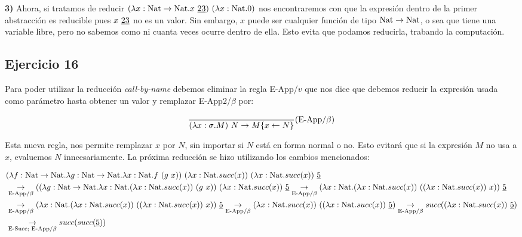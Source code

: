\documentclass[10pt,a4paper, landscape]{article}
\begin{document}
\begin{multicols}{2}
\textbf{3)} Ahora, si tratamos de reducir $(\lambda x: \text{Nat}\to\text{Nat} \text{.} x~\underline{23})~(\lambda x: \text{Nat} \text{.} 0)$ nos encontraremos con que la expresión dentro de la primer abstracción es reducible pues $x~\underline{23}$ no es un valor. Sin embargo,  $x$ puede ser cualquier función de tipo  $\text{Nat}\to\text{Nat}$, o sea que tiene una variable libre, pero no sabemos como ni cuanta veces ocurre dentro de ella. Esto evita que podamos reducirla, trabando la computación.
\end{multicols}


\newpage

\subsection{Ejercicio 16}
\begin{multicols}{2}
Para poder utilizar la reducción \textit{call-by-name} debemos eliminar la regla E-App/$v$ que nos dice que debemos reducir la expresión usada como parámetro hasta obtener un valor y remplazar E-App2/$\beta$ por:
\vfil

$$\frac{}{(\lambda x: \sigma \text{.} M)~N \to M\{x\leftarrow N\}}(\text{E-App/}\beta)$$

Esta nueva regla, nos permite remplazar $x$ por $N$, sin importar si $N$ está en forma normal o no. Esto evitará que si la expresión $M$ no usa a $x$, evaluemos $N$ inncesariamente. La próxima reducción se hizo utilizando los cambios mencionados:
\end{multicols}

\begin{equation*}
\begin{split}
&(\lambda f: \text{Nat}\to\text{Nat} \text{.} \lambda g: \text{Nat}\to\text{Nat} \text{.} \lambda x: \text{Nat} \text{.} f~(g~x))~(\lambda x: \text{Nat} \text{.} succ(x))~(\lambda x: \text{Nat} \text{.} succ(x))~\underline{5} \\
&\underset{\text{E-App}/\beta}{\to} ((\lambda g: \text{Nat}\to\text{Nat} \text{.} \lambda x: \text{Nat} \text{.} (\lambda x: \text{Nat} \text{.} succ(x))~(g~x))~(\lambda x: \text{Nat} \text{.} succ(x))~\underline{5}
\underset{\text{E-App}/\beta}{\to} (\lambda x: \text{Nat} \text{.} (\lambda x: \text{Nat} \text{.} succ(x))~((\lambda x: \text{Nat} \text{.} succ(x))~x))~\underline{5}\\
&\underset{\text{E-App}/\beta}{\to} (\lambda x: \text{Nat} \text{.} (\lambda x: \text{Nat} \text{.} succ(x))~((\lambda x: \text{Nat} \text{.} succ(x))~x))~\underline{5} 
\underset{\text{E-App}/\beta}{\to} (\lambda x: \text{Nat} \text{.} succ(x))~((\lambda x: \text{Nat} \text{.} succ(x))~\underline{5})
\underset{\text{E-App}/\beta}{\to} succ((\lambda x: \text{Nat} \text{.} succ(x))~\underline{5}) \\
&\underset{\text{E-Succ; E-App}/\beta}{\to} succ(succ(\underline{5})) 
\end{split}
\end{equation*}
\end{document}
